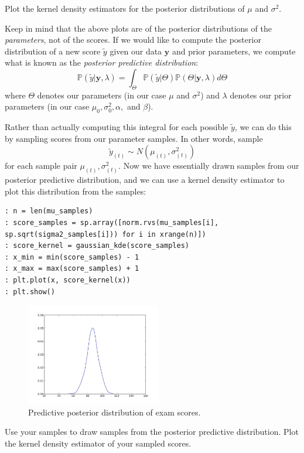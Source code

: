 \begin{problem}
Plot the kernel density estimators for the posterior distributions of $\mu$ and $\sigma^{2}$.
\end{problem}

Keep in mind that the above plots are of the posterior distributions of the \emph{parameters}, not of the scores. If we would like to compute the posterior distribution of a new score $\tilde{y}$ given our data $\mathbf{y}$ and prior parameters, we compute what is known as the \emph{posterior predictive distribution}: $$\mathbb{P}(\tilde{y} | \mathbf{y}, \lambda) = \int_{\Theta} \mathbb{P}(\tilde{y} | \Theta)\mathbb{P}(\Theta | \mathbf{y}, \lambda) d\Theta$$ where $\Theta$ denotes our parameters (in our case $\mu$ and $\sigma^{2}$) and $\lambda$ denotes our prior parameters (in our case $\mu_{0}, \sigma_{0}^{2}, \alpha,$ and $\beta$).

Rather than actually computing this integral for each possible $\tilde{y}$, we can do this by sampling scores from our parameter samples. In other words, sample $$\tilde{y}_{(t)} \sim N(\mu_{(t)}, \sigma_{(t)}^{2})$$ for each sample pair $\mu_{(t)}, \sigma_{(t)}^{2}$. Now we have essentially drawn samples from our posterior predictive distribution, and we can use a kernel density estimator to plot this distribution from the samples:

\begin{lstlisting}[style=python]
: n = len(mu_samples)
: score_samples = sp.array([norm.rvs(mu_samples[i], sp.sqrt(sigma2_samples[i])) for i in xrange(n)])
: score_kernel = gaussian_kde(score_samples)
: x_min = min(score_samples) - 1
: x_max = max(score_samples) + 1
: plt.plot(x, score_kernel(x))
: plt.show()
\end{lstlisting}

\begin{figure}
\begin{center}
\includegraphics[height=1.75in]{predictiveposterior.jpeg}
\end{center}
\caption{Predictive posterior distribution of exam scores.}
\end{figure}

\begin{problem}
Use your samples to draw samples from the posterior predictive distribution. Plot the kernel density estimator of your sampled scores.
\end{problem}